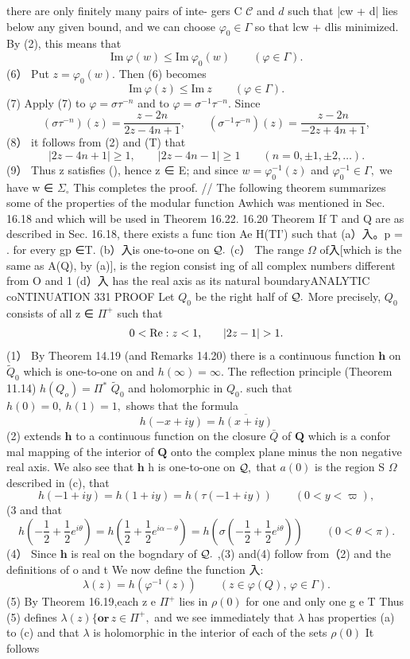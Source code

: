 there are only finitely many pairs of inte- gers C $\scriptstyle{\mathcal{C}}$ and $d$ such that |cw + d| lies below any given bound, and we can choose $\varphi_{0}\in\Gamma$ so that lcw + dlis minimized. By (2), this means that $$ \mathrm{Im}\ \varphi(w)\leq\mathrm{Im}\ \varphi_{0}(w)\qquad(\varphi\in\Gamma). $$ (6） Put $z=\varphi_{0}(w).$ Then (6) becomes $$ \mathrm{Im~}\varphi(z)\leq\mathrm{Im~}z\qquad(\varphi\in\Gamma). $$ (7) Apply (7) to $\varphi=\sigma\tau^{-n}$ and to $\varphi=\sigma^{-1}\tau^{-n}.$ Since $$ (\sigma\tau^{-n})(z)=\frac{z-2n}{2z-4n+1},\qquad(\sigma^{-1}\tau^{-n})(z)=\frac{z-2n}{-2z+4n+1}, $$ (8） it follows from (2) and (T) that $$ |2z-4n+1|\geq1,\qquad|2z-4n-1|\geq1\qquad(n=0,\pm1,\pm2,\ldots). $$ (9） Thus z satisfies (), hence z ∈ E; and since $w=\varphi_{0}^{-1}(z)$ and $\varphi_{0}^{-1}\in\Gamma,$ we have w ∈ $\Sigma_{\circ}$ This completes the proof. // The following theorem summarizes some of the properties of the modular function Awhich was mentioned in Sec. 16.18 and which will be used in Theorem 16.22. 16.20 Theorem If T and Q are as described in Sec. 16.18, there exists a func tion Ae H(TI') such that (a）入。p = . for every gp ∈T. (b）入is one-to-one on ${\cal Q}.$ (c） The range $\Omega$ of入[which is the same as A(Q), by (a)], is the region consist ing of all complex numbers different from O and 1 (d）入 has the real axis as its natural boundaryANALYTIC coNTINUATION 331 PROOF Let $Q_{0}$ be the right half of ${\cal Q}.$ More precisely, $Q_{0}$ consists of all z ∈ $\Pi^{+}$ such that $$ \begin{array}{r l}{0<\mathrm{{Re}}:z<1,}&{{}\quad|2z-1|>1.}\end{array} $$ (1） By Theorem 14.19 (and Remarks 14.20) there is a continuous function $\boldsymbol{h}$ on ${\tilde{Q}}_{0}$ which is one-to-one on and $h(\infty)=\infty.$ The reflection principle (Theorem 11.14) $h(Q_{o})=\Pi^{*}$ ${\tilde{Q}}_{0}$ and holomorphic in $Q_{0}.$ such that $h(0)=0,\ h(1)=1,$ shows that the formula $$ h(-x+i y)={\overline{{h(x+i y)}}} $$ (2) extends ${\boldsymbol{h}}$ to a continuous function on the closure $\bar{Q}$ of ${\boldsymbol{Q}}$ which is a confor mal mapping of the interior of ${\boldsymbol{Q}}$ onto the complex plane minus the non negative real axis. We also see that ${\boldsymbol{h}}$ h is one-to-one on ${\cal Q},$ that $\scriptstyle a(0)$ is the region S $\Omega$ described in (c), that $$ h(-1+i y)=h(1+i y)=h(\tau(-1+i y))\qquad(0<y<\varpi), $$ (3 and that $$ h(-\textstyle{\frac{1}{2}}+\textstyle{\frac{1}{2}}e^{i\theta})=h(\textstyle{\frac{1}{2}}+\textstyle{\frac{1}{2}}e^{i\alpha-\theta})=h(\textstyle{\sigma}(-\textstyle{\frac{1}{2}}+{\textstyle{\frac{1}{2}}}e^{i\theta}))\qquad(0<\theta<\pi). $$ (4） Since $\boldsymbol{h}$ is real on the bogndary of ${\cal Q}.$ ,(3) and(4) follow from（2) and the definitions of o and t We now define the function 入: $$ \lambda(z)=h(\varphi^{-1}(z))\qquad(z\in\varphi(Q),\,\varphi\in\Gamma). $$ (5) By Theorem 16.19,each z e $\Pi^{+}$ lies in $\scriptstyle{\rho(0)}$ for one and only one g e T Thus (5) defines $\lambda(z) \{\mathbf{or}\,z\in\Pi^{+},$ and we see immediately that $\lambda$ has properties (a) to (c) and that $\lambda$ is holomorphic in the interior of each of the sets $\scriptstyle{\rho(0)}$ It follows 